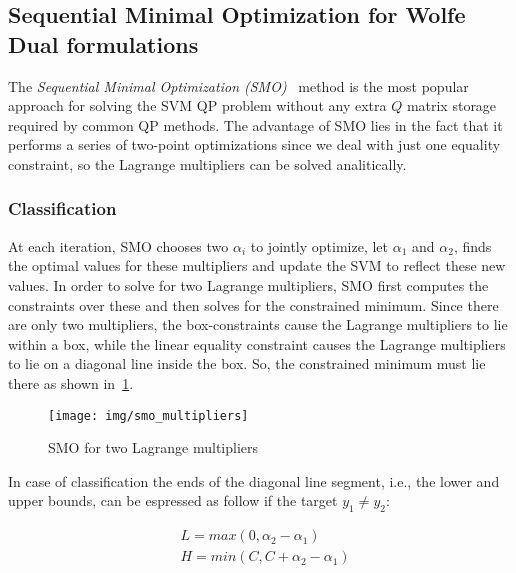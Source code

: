 \pagebreak

\subsection{Sequential Minimal Optimization for Wolfe Dual formulations}

The \emph{Sequential Minimal Optimization (SMO)}~\cite{platt1998sequential} method is the most popular approach for solving the SVM QP problem without any extra $Q$ matrix storage required by common QP methods. The advantage of SMO lies in the fact that it performs a series of two-point optimizations since we deal with just one equality constraint, so the Lagrange multipliers can be solved analitically.

\subsubsection{Classification}

At each iteration, SMO chooses two $\alpha_i$ to jointly optimize, let $\alpha_1$ and $\alpha_2$, finds the optimal values for these multipliers and update the SVM to reflect these new values. In order to solve for two Lagrange multipliers, SMO first computes the constraints over these and then solves for the constrained minimum. Since there are only two multipliers, the box-constraints cause the Lagrange multipliers to lie within a box, while the linear equality constraint causes the Lagrange multipliers to lie on a diagonal line inside the box. So, the constrained minimum must lie there as shown in~\ref{fig:smo_lagrange_multipliers}.

\begin{figure}[h!]
	\centering
	\texttt{[image: img/smo\_multipliers]}
	\caption{SMO for two Lagrange multipliers}
	\label{fig:smo_lagrange_multipliers}
\end{figure}

In case of classification the ends of the diagonal line segment, i.e., the lower and upper bounds, can be espressed as follow if the target $y_1 \ne y_2$:

\begin{equation} \label{eq:smo_svc_bounds_update1}
	\begin{aligned}
		& L = max(0, \alpha_2 - \alpha_1) \\
		& H = min(C, C + \alpha_2 - \alpha_1)
	\end{aligned}
\end{equation}

